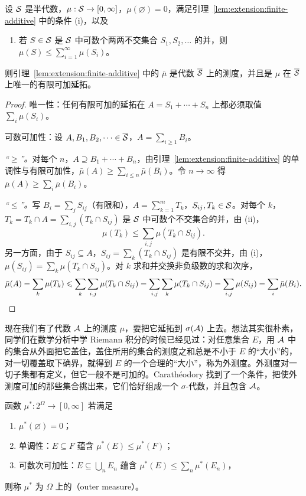 \begin{theorem}[从半代数到代数]\label{thm:extension:semialgebra}
设 $\mathcal{S}$ 是半代数，$\mu:\mathcal{S}\to[0,\infty]$，$\mu(\varnothing)=0$，满足引理~\ref{lem:extension:finite-additive} 中的条件 (i)，以及
\begin{enumerate}
\item[(ii)] 若 $S\in\mathcal{S}$ 是 $\mathcal{S}$ 中可数个两两不交集合 $S_1,S_2,\dots$ 的并，则 $\mu(S)\leqslant\sum_{i=1}^\infty\mu(S_i)$。
\end{enumerate}
则引理~\ref{lem:extension:finite-additive} 中的 $\bar\mu$ 是代数 $\overline{\mathcal{S}}$ 上的测度，并且是 $\mu$ 在 $\overline{\mathcal{S}}$ 上唯一的有限可加延拓。
\end{theorem}
\begin{proof}
唯一性：任何有限可加的延拓在 $A=S_1+\cdots+S_n$ 上都必须取值 $\sum_i\mu(S_i)$。

可数可加性：设 $A,B_1,B_2,\dots\in\overline{\mathcal{S}}$，$A=\sum_{i\geqslant1}B_i$。

\emph{“$\geqslant$”。}对每个 $n$，$A\supseteq B_1+\cdots+B_n$，由引理~\ref{lem:extension:finite-additive} 的单调性与有限可加性，$\bar\mu(A)\geqslant\sum_{i\leqslant n}\bar\mu(B_i)$。令 $n\to\infty$ 得 $\bar\mu(A)\geqslant\sum_i\bar\mu(B_i)$。

\emph{“$\leqslant$”。}写 $B_i=\sum_jS_{ij}$（有限和），$A=\sum_{k=1}^mT_k$，$S_{ij},T_k\in\mathcal{S}$。对每个 $k$，$T_k=T_k\cap A=\sum_{i,j}(T_k\cap S_{ij})$ 是 $\mathcal{S}$ 中可数个不交集合的并，由 (ii)，
\[
\mu(T_k)\leqslant\sum_{i,j}\mu(T_k\cap S_{ij}).
\]
另一方面，由于 $S_{ij}\subseteq A$，$S_{ij}=\sum_k(T_k\cap S_{ij})$ 是有限不交并，由 (i)，$\mu(S_{ij})=\sum_k\mu(T_k\cap S_{ij})$。对 $k$ 求和并交换非负级数的求和次序，
\[
\bar\mu(A)=\sum_k\mu(T_k)\leqslant\sum_k\sum_{i,j}\mu(T_k\cap S_{ij})=\sum_{i,j}\sum_k\mu(T_k\cap S_{ij})=\sum_{i,j}\mu(S_{ij})=\sum_i\bar\mu(B_i).\qedhere
\]
\end{proof}


现在我们有了代数 $\mathcal{A}$ 上的测度 $\mu$，要把它延拓到 $\sigma(\mathcal{A})$ 上去。想法其实很朴素，同学们在数学分析中学 Riemann 积分的时候已经见过：对任意集合 $E$，用 $\mathcal{A}$ 中的集合从外面把它盖住，盖住所用的集合的测度之和总是不小于 $E$ 的“大小”的，对一切覆盖取下确界，就得到 $E$ 的一个合理的“大小”，称为外测度。外测度对一切子集都有定义，但它一般不是可加的。Carathéodory 找到了一个条件，把使外测度可加的那些集合挑出来，它们恰好组成一个 $\sigma$-代数，并且包含 $\mathcal{A}$。

\begin{definition}[外测度]\label{def:extension:outer}
函数 $\mu^*:2^\Omega\to[0,\infty]$ 若满足
\begin{enumerate}
\item $\mu^*(\varnothing)=0$；
\item 单调性：$E\subseteq F$ 蕴含 $\mu^*(E)\leqslant\mu^*(F)$；
\item 可数次可加性：$E\subseteq\bigcup_nE_n$ 蕴含 $\mu^*(E)\leqslant\sum_n\mu^*(E_n)$，
\end{enumerate}
则称 $\mu^*$ 为 $\Omega$ 上的（outer measure）。
\end{definition}

